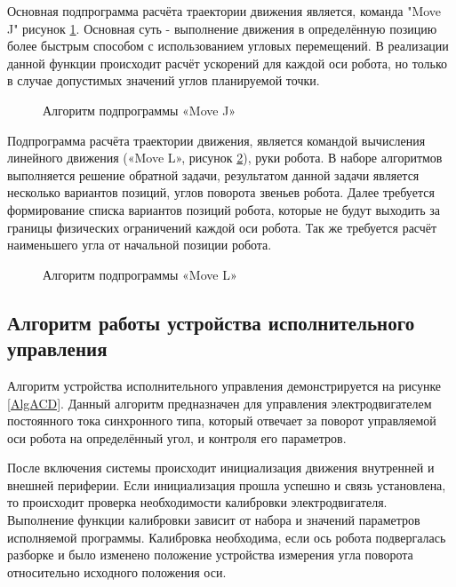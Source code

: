 Основная подпрограмма расчёта траектории движения является, команда "Move J" рисунок \ref{AlgJ}. Основная суть - выполнение движения в определённую позицию более быстрым способом с использованием угловых перемещений. В реализации данной функции происходит расчёт ускорений для каждой оси робота, но только в случае допустимых значений углов планируемой точки. 

\begin{figure}[H]
	\centering
	
	\caption{Алгоритм подпрограммы «Move J»}
	\label{AlgJ}
\end{figure}

Подпрограмма расчёта траектории движения, является командой вычисления линейного движения («Move L», рисунок \ref{AlgL}), руки робота. В наборе алгоритмов выполняется решение обратной задачи, результатом данной задачи является несколько вариантов позиций, углов поворота звеньев робота. Далее требуется формирование списка вариантов позиций робота, которые не будут выходить за границы физических ограничений каждой оси робота. Так же требуется расчёт наименьшего угла от начальной позиции робота.

\begin{figure}[H]
	\centering
	
	\caption{Алгоритм подпрограммы «Move L»}
	\label{AlgL}
\end{figure}

\subsection{Алгоритм работы устройства исполнительного управления}
Алгоритм устройства исполнительного управления демонстрируется на рисунке \ref{AlgACD}. Данный алгоритм предназначен для управления электродвигателем постоянного тока синхронного типа, который отвечает за поворот управляемой оси робота на определённый угол, и контроля его параметров. 

После включения системы происходит инициализация движения внутренней и внешней периферии. Если инициализация прошла успешно и связь установлена, то происходит проверка необходимости калибровки электродвигателя. Выполнение функции калибровки зависит от набора и значений параметров исполняемой программы. Калибровка необходима, если ось робота подвергалась разборке и было изменено положение устройства измерения угла поворота относительно исходного положения оси.

